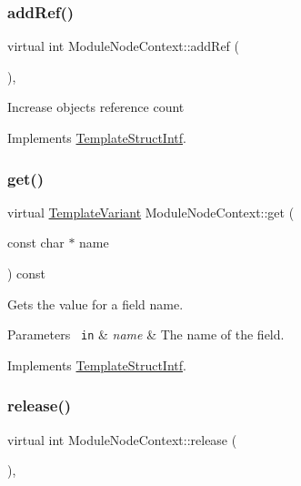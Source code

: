 \subsubsection{\texorpdfstring{addRef()}{addRef()}}
{\footnotesize\ttfamily virtual int Module\+Node\+Context\+::add\+Ref (\begin{DoxyParamCaption}{ }\end{DoxyParamCaption})\hspace{0.3cm}{\ttfamily [inline]}, {\ttfamily [virtual]}}

Increase object\textquotesingle{}s reference count 

Implements \mbox{\hyperlink{class_template_struct_intf_a05fe97ad47633beb326f69686faed581}{Template\+Struct\+Intf}}.

\mbox{\label{class_module_node_context_a5257de331aa6d0e74d209d61a2fc29f2}} 
\subsubsection{\texorpdfstring{get()}{get()}}
{\footnotesize\ttfamily virtual \mbox{\hyperlink{class_template_variant}{Template\+Variant}} Module\+Node\+Context\+::get (\begin{DoxyParamCaption}\item[{const char $\ast$}]{name }\end{DoxyParamCaption}) const\hspace{0.3cm}{\ttfamily [virtual]}}

Gets the value for a field name. 
\begin{DoxyParams}[1]{Parameters}
\mbox{\texttt{ in}}  & {\em name} & The name of the field. \\
\hline
\end{DoxyParams}


Implements \mbox{\hyperlink{class_template_struct_intf_a3d610cb81b4adbb531ebed3aa3d09b51}{Template\+Struct\+Intf}}.

\mbox{\label{class_module_node_context_adbd3a06adc44c46a8124fc61634dd0c5}} 
\subsubsection{\texorpdfstring{release()}{release()}}
{\footnotesize\ttfamily virtual int Module\+Node\+Context\+::release (\begin{DoxyParamCaption}{ }\end{DoxyParamCaption})\hspace{0.3cm}{\ttfamily [inline]}, {\ttfamily [virtual]}}

